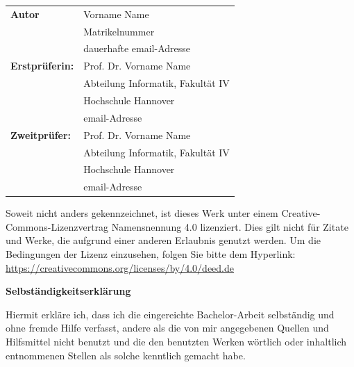 \documentclass[
  twoside,
  paper=a4,
  fontsize=12pt,
  parskip=half-,
  headsepline,
  headinclude]{scrreprt}
\begin{document}
\newpage \thispagestyle{empty}
\begin{tabular}{ll}
  {\bfseries\sffamily Autor}         & Vorname Name                      \\
                                     & Matrikelnummer                    \\
                                     & dauerhafte email-Adresse          \\[5ex]
  {\bfseries\sffamily Erstprüferin:} & Prof. Dr. Vorname Name            \\
                                     & Abteilung Informatik, Fakultät IV \\
                                     & Hochschule Hannover               \\
                                     & email-Adresse                     \\[5ex]
  {\bfseries\sffamily Zweitprüfer:}  & Prof. Dr. Vorname Name            \\
                                     & Abteilung Informatik, Fakultät IV \\
                                     & Hochschule Hannover               \\
                                     & email-Adresse
\end{tabular}

\vfill

Soweit nicht anders gekennzeichnet, ist dieses Werk unter einem
Creative-Commons-Lizenzvertrag Namensnennung 4.0 lizenziert.
Dies gilt nicht für Zitate und Werke, die aufgrund einer anderen Erlaubnis
genutzt werden.
Um die Bedingungen der Lizenz einzusehen, folgen Sie bitte dem Hyperlink:\\
\url{https://creativecommons.org/licenses/by/4.0/deed.de}

\vfill

\begin{center} \sffamily\bfseries Selbständigkeitserklärung \end{center}

Hiermit erkläre ich, dass ich die eingereichte Bachelor-Arbeit
selbständig und ohne fremde Hilfe verfasst, andere als die von mir angegebenen Quellen
und Hilfsmittel nicht benutzt und die den benutzten Werken wörtlich oder
inhaltlich entnommenen Stellen als solche kenntlich gemacht habe.
\vspace*{7ex}
\end{document}
